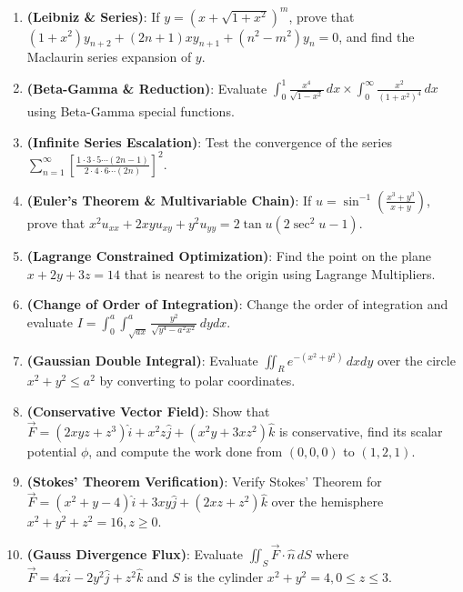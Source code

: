 \begin{practiceset}
\begin{enumerate}[leftmargin=1.5em]
    \item \textbf{(Leibniz \& Series)}: If $y = (x + \sqrt{1+x^2})^m$, prove that $(1+x^2)y_{n+2} + (2n+1)xy_{n+1} + (n^2-m^2)y_n = 0$, and find the Maclaurin series expansion of $y$.
    \item \textbf{(Beta-Gamma \& Reduction)}: Evaluate $\int_0^1 \frac{x^4}{\sqrt{1-x^2}}\,dx \times \int_0^\infty \frac{x^2}{(1+x^2)^4}\,dx$ using Beta-Gamma special functions.
    \item \textbf{(Infinite Series Escalation)}: Test the convergence of the series $\sum_{n=1}^\infty \left[ \frac{1 \cdot 3 \cdot 5 \cdots (2n-1)}{2 \cdot 4 \cdot 6 \cdots (2n)} \right]^2$.
    \item \textbf{(Euler's Theorem \& Multivariable Chain)}: If $u = \sin^{-1}\left(\frac{x^3+y^3}{x+y}\right)$, prove that $x^2 u_{xx} + 2xy u_{xy} + y^2 u_{yy} = 2\tan u (2\sec^2 u - 1)$.
    \item \textbf{(Lagrange Constrained Optimization)}: Find the point on the plane $x + 2y + 3z = 14$ that is nearest to the origin using Lagrange Multipliers.
    \item \textbf{(Change of Order of Integration)}: Change the order of integration and evaluate $I = \int_0^a \int_{\sqrt{ax}}^a \frac{y^2}{\sqrt{y^4 - a^2 x^2}}\,dy dx$.
    \item \textbf{(Gaussian Double Integral)}: Evaluate $\iint_R e^{-(x^2+y^2)}\,dx dy$ over the circle $x^2+y^2 \le a^2$ by converting to polar coordinates.
    \item \textbf{(Conservative Vector Field)}: Show that $\vec{F} = (2xyz + z^3)\hat{i} + x^2 z\hat{j} + (x^2 y + 3xz^2)\hat{k}$ is conservative, find its scalar potential $\phi$, and compute the work done from $(0,0,0)$ to $(1,2,1)$.
    \item \textbf{(Stokes' Theorem Verification)}: Verify Stokes' Theorem for $\vec{F} = (x^2+y-4)\hat{i} + 3xy\hat{j} + (2xz+z^2)\hat{k}$ over the hemisphere $x^2+y^2+z^2 = 16, z \ge 0$.
    \item \textbf{(Gauss Divergence Flux)}: Evaluate $\iint_S \vec{F}\cdot\hat{n}\,dS$ where $\vec{F} = 4x\hat{i} - 2y^2\hat{j} + z^2\hat{k}$ and $S$ is the cylinder $x^2+y^2 = 4, 0 \le z \le 3$.
\end{enumerate}
\end{practiceset}

